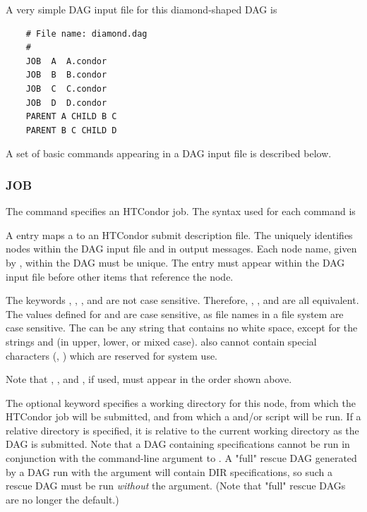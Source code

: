 A very simple DAG input file for this diamond-shaped DAG is

\footnotesize
\begin{verbatim}
    # File name: diamond.dag
    #
    JOB  A  A.condor 
    JOB  B  B.condor 
    JOB  C  C.condor	
    JOB  D  D.condor
    PARENT A CHILD B C
    PARENT B C CHILD D
\end{verbatim}
\normalsize

A set of basic commands appearing in a DAG input file is described below.


\subsubsection{\label{sec:dagman_job_command}JOB}
\label{dagman:JOB}

The  command specifies an HTCondor job.
The syntax used for each  command is

  
  

A  entry maps a  to an HTCondor submit description file.
The  uniquely identifies nodes within the
DAG input file and in output messages.
Each node name, given by , within the DAG must be unique.
The  entry must appear within the DAG input file before
other items that reference the node.

The keywords , , , and 
are not case sensitive.
Therefore, , , and  are all equivalent.
The values defined for  and 
are case sensitive, as file names 
in a file system are case sensitive.
The  can be any string that contains no white space, except
for the strings  and  (in upper, lower, or mixed
case).  also cannot contain special characters (, 
) which are reserved for system use.

Note that , , and , if used, must appear
in the order shown above.

The optional  keyword specifies a working directory
for this node,
from which the HTCondor job will be submitted,
and from which a  and/or
 script will be run.
If a relative directory is specified, it is relative to the current working 
directory as the DAG is submitted.
Note that a DAG containing  specifications cannot
be run in conjunction with the  command-line
argument to .
A "full" rescue DAG generated by a DAG run with the  argument
will contain DIR specifications, so such a rescue DAG must be run
\emph{without} the  argument.  (Note that "full"
rescue DAGs are no longer the default.)

